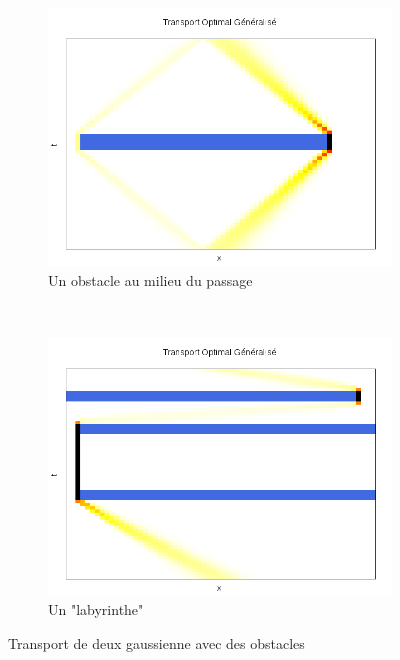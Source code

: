 \documentclass[a4paper,12pt]{article}
\begin{document}
\begin{figure}[!h]
	\begin{subfigure}[b]{0.48\linewidth}
	\includegraphics[width=\textwidth]{img/1DObstacle/resultat.png}
	\caption{Un obstacle au milieu du passage}
	\end{subfigure}
	~
	\begin{subfigure}[b]{0.48\linewidth}
	\includegraphics[width=\textwidth]{img/1DLabyrinthe/resultat.png}
	\caption{Un "labyrinthe"}
	\end{subfigure}	
	\caption{Transport de deux gaussienne avec des obstacles}
\end{figure}

\newpage
\end{document}
